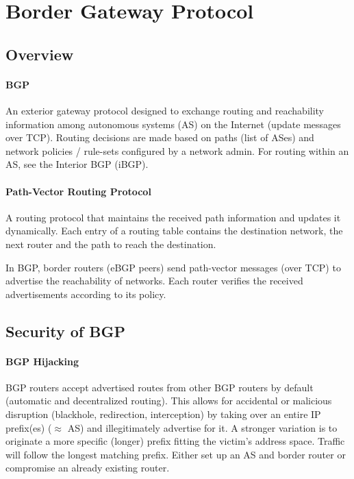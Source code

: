\section{Border Gateway Protocol}

\subsection{Overview}

\paragraph{BGP} An exterior gateway protocol designed to exchange routing and reachability information among autonomous systems (AS) on the Internet (update messages over TCP). Routing decisions are made based on paths (list of ASes) and network policies / rule-sets configured by a network admin. For routing within an AS, see the Interior BGP (iBGP). %

\paragraph{Path-Vector Routing Protocol} A routing protocol that maintains the received path information and updates it dynamically. Each entry of a routing table contains the destination network, the next router and the path to reach the destination.

In BGP, border routers (eBGP peers) send path-vector messages (over TCP) to advertise the reachability of networks. Each router verifies the received advertisements according to its policy.


\subsection{Security of BGP}

\paragraph{BGP Hijacking} BGP routers accept advertised routes from other BGP routers by default (automatic and decentralized routing). This allows for accidental or malicious disruption (blackhole, redirection, interception) by taking over an entire IP prefix(es) ($\approx$ AS) and illegitimately advertise for it. A stronger variation is to originate a more specific (longer) prefix fitting the victim's address space. Traffic will follow the longest matching prefix. Either set up an AS and border router or compromise an already existing router.


